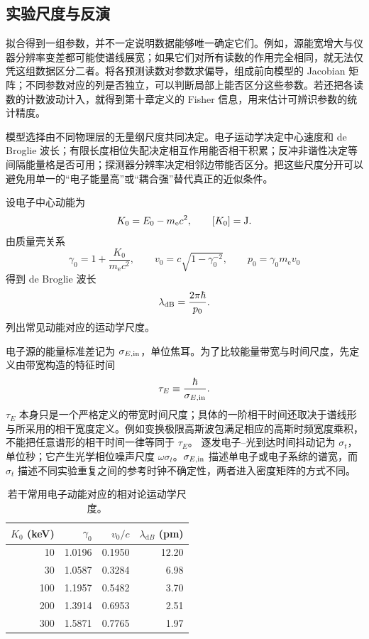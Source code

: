 \subsection{实验尺度与反演}\label{subsec:experimental-scales-inversion-dp19}

拟合得到一组参数，并不一定说明数据能够唯一确定它们。例如，源能宽增大与仪器分辨率变差都可能使谱线展宽；如果它们对所有读数的作用完全相同，就无法仅凭这组数据区分二者。将各预测读数对参数求偏导，组成前向模型的 Jacobian 矩阵；不同参数对应的列是否独立，可以判断局部上能否区分这些参数。若还把各读数的计数波动计入，就得到第十章定义的 Fisher 信息，用来估计可辨识参数的统计精度。

模型选择由不同物理层的无量纲尺度共同决定。电子运动学决定中心速度和 de Broglie 波长；有限长度相位失配决定相互作用能否相干积累；反冲非谐性决定等间隔能量格是否可用；探测器分辨率决定相邻边带能否区分。把这些尺度分开可以避免用单一的“电子能量高”或“耦合强”替代真正的近似条件。

设电子中心动能为
\begin{equation*}
K_0=E_0-m_{\mathrm e} c^2,
\qquad [K_0]={\rm J}.
\end{equation*}
由质量壳关系
\begin{equation*}
\gamma_0=1+\frac{K_0}{m_{\mathrm e} c^2},
\qquad
v_0=c\sqrt{1-\gamma_0^{-2}},
\qquad
p_0=\gamma_0m_{\mathrm e} v_0
\end{equation*}
得到 de Broglie 波长
\begin{equation*}
\lambda_{\rm dB}=\frac{2\pi\hbar}{p_0}.
\end{equation*}
 列出常见动能对应的运动学尺度。

电子源的能量标准差记为 $\sigma_{E,{\rm in}}$，单位焦耳。为了比较能量带宽与时间尺度，先定义由带宽构造的特征时间
\begin{equation*}
\tau_E\equiv\frac{\hbar}{\sigma_{E,{\rm in}}}.
\end{equation*}
$\tau_E$ 本身只是一个严格定义的带宽时间尺度；具体的一阶相干时间还取决于谱线形与所采用的相干宽度定义。例如变换极限高斯波包满足相应的高斯时频宽度乘积，不能把任意谱形的相干时间一律等同于 $\tau_E$。
逐发电子--光到达时间抖动记为 $\sigma_t$，单位秒；它产生光学相位噪声尺度 $\omega\sigma_t$。$\sigma_{E,{\rm in}}$ 描述单电子或电子系综的谱宽，而 $\sigma_t$ 描述不同实验重复之间的参考时钟不确定性，两者进入密度矩阵的方式不同。

\begin{table}[H]
\centering
\caption{若干常用电子动能对应的相对论运动学尺度。}
\label{tab:electron_kinematic_scales}
\begin{tabular}{rrrr}
\toprule
$K_0$ (keV) & $\gamma_0$ & $v_0/c$ & $\lambda_{\mathrm dB}$ (pm)\\
\midrule
10 & 1.0196 & 0.1950 & 12.20\\
30 & 1.0587 & 0.3284 & 6.98\\
100 & 1.1957 & 0.5482 & 3.70\\
200 & 1.3914 & 0.6953 & 2.51\\
300 & 1.5871 & 0.7765 & 1.97\\
\bottomrule
\end{tabular}
\end{table}

